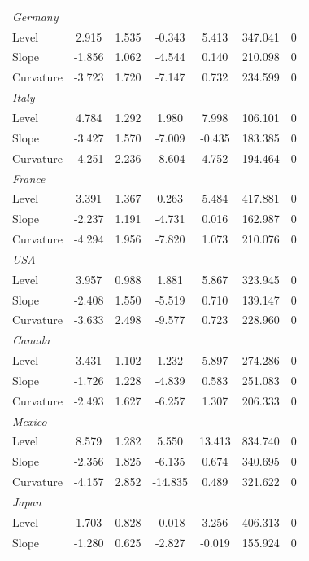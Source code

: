 \documentclass{article}
\begin{document}
\begin{table}[H]
\begin{tabular}{l c c c c c c}
\textit{Germany}	&		&		&		&		&		&		\\
Level	&	2.915	&	1.535	&	-0.343	&	5.413	&	347.041	&	0	\\
Slope	&	-1.856	&	1.062	&	-4.544	&	0.140	&	210.098	&	0	\\
\medskip													
Curvature	&	-3.723	&	1.720	&	-7.147	&	0.732	&	234.599	&	0	\\
\textit{Italy}	&		&		&		&		&		&		\\
Level	&	4.784	&	1.292	&	1.980	&	7.998	&	106.101	&	0	\\
Slope	&	-3.427	&	1.570	&	-7.009	&	-0.435	&	183.385	&	0	\\
\medskip													
Curvature	&	-4.251	&	2.236	&	-8.604	&	4.752	&	194.464	&	0	\\
\textit{France}	&		&		&		&		&		&		\\
Level	&	3.391	&	1.367	&	0.263	&	5.484	&	417.881	&	0	\\
Slope	&	-2.237	&	1.191	&	-4.731	&	0.016	&	162.987	&	0	\\
\medskip													
Curvature	&	-4.294	&	1.956	&	-7.820	&	1.073	&	210.076	&	0	\\
\textit{USA}	&		&		&		&		&		&		\\
Level	&	3.957	&	0.988	&	1.881	&	5.867	&	323.945	&	0	\\
Slope	&	-2.408	&	1.550	&	-5.519	&	0.710	&	139.147	&	0	\\
\medskip													
Curvature	&	-3.633	&	2.498	&	-9.577	&	0.723	&	228.960	&	0	\\
\textit{Canada}	&		&		&		&		&		&		\\
Level	&	3.431	&	1.102	&	1.232	&	5.897	&	274.286	&	0	\\
Slope	&	-1.726	&	1.228	&	-4.839	&	0.583	&	251.083	&	0	\\
\medskip													
Curvature	&	-2.493	&	1.627	&	-6.257	&	1.307	&	206.333	&	0	\\
\textit{Mexico}	&		&		&		&		&		&		\\
Level	&	8.579	&	1.282	&	5.550	&	13.413	&	834.740	&	0	\\
Slope	&	-2.356	&	1.825	&	-6.135	&	0.674	&	340.695	&	0	\\
\medskip													
Curvature	&	-4.157	&	2.852	&	-14.835	&	0.489	&	321.622	&	0	\\
\textit{Japan}	&		&		&		&		&		&		\\
Level	&	1.703	&	0.828	&	-0.018	&	3.256	&	406.313	&	0	\\
Slope	&	-1.280	&	0.625	&	-2.827	&	-0.019	&	155.924	&	0	\\

\end{tabular}
\end{table}
\end{document}

